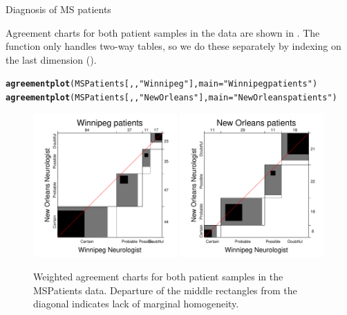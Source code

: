 \documentclass[11pt]{book}\usepackage[]{graphicx}\usepackage[]{color}
\makeatletter
\newcommand{\hlstr}[1]{\textcolor[rgb]{0.192,0.494,0.8}{#1}}%
\newcommand{\hlstd}[1]{\textcolor[rgb]{0.345,0.345,0.345}{#1}}%
\newcommand{\hlkwc}[1]{\textcolor[rgb]{0.333,0.667,0.333}{#1}}%
\newcommand{\hlkwd}[1]{\textcolor[rgb]{0.737,0.353,0.396}{\textbf{#1}}}%
\newenvironment{kframe}{%
 \def\at@end@of@kframe{}%
 \ifinner\ifhmode%
  \def\at@end@of@kframe{\end{minipage}}%
  \begin{minipage}{\columnwidth}%
 \fi\fi%
 \def\FrameCommand##1{\hskip\@totalleftmargin \hskip-\fboxsep
 \colorbox{shadecolor}{##1}\hskip-\fboxsep
     \hskip-\linewidth \hskip-\@totalleftmargin \hskip\columnwidth}%
 \MakeFramed {\advance\hsize-\width
   \@totalleftmargin\z@ \linewidth\hsize
   \@setminipage}}%
 {\par\unskip\endMakeFramed%
 \at@end@of@kframe}
\newenvironment{knitrout}{}{} %
\renewenvironment{knitrout}{\small\renewcommand{\baselinestretch}{.85}}{} %
\makeatother
\begin{document}
\begin{Example}[MS2]{Diagnosis of MS patients}

Agreement charts for both patient samples in the  data
are shown in . The  function
only handles two-way tables, so we do these separately by indexing
on the last dimension ().

\begin{knitrout}
\color{fgcolor}\begin{kframe}
\begin{alltt}
\hlkwd{agreementplot}\hlstd{(MSPatients[,,}\hlstr{"Winnipeg"}\hlstd{],} \hlkwc{main}\hlstd{=}\hlstr{"Winnipeg patients"}\hlstd{)}
\hlkwd{agreementplot}\hlstd{(MSPatients[,,}\hlstr{"New Orleans"}\hlstd{],} \hlkwc{main}\hlstd{=}\hlstr{"New Orleans patients"}\hlstd{)}
\end{alltt}
\end{kframe}\begin{figure}[htbp]


\centerline{\includegraphics[width=0.49\textwidth]{ch04/fig/MS-agree1} 
\includegraphics[width=0.49\textwidth]{ch04/fig/MS-agree2} }

\caption[Weighted agreement charts for both patient samples in the MSPatients data]{Weighted agreement charts for both patient samples in the MSPatients data. Departure of the middle rectangles from the diagonal indicates lack of marginal homogeneity.\label{fig:MS-agree}}
\end{figure}



\end{knitrout}
\end{Example}
\end{document}
